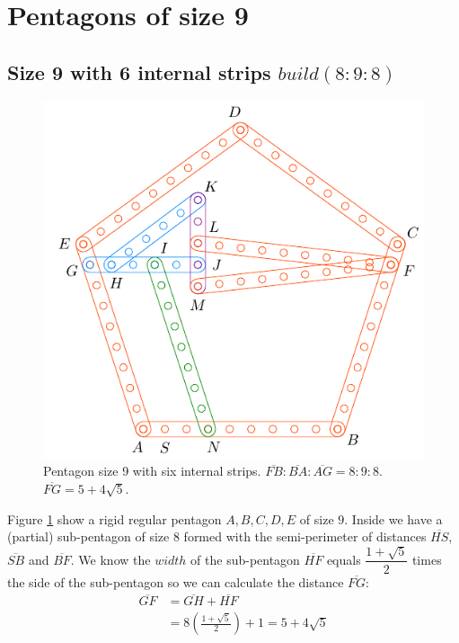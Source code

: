 \documentclass[11pt]{article}
\begin{document}

\section{Pentagons of size 9}

\subsection{Size 9 with 6 internal strips $build(8:9:8)$}

\begin{figure}[h]
 \centering
 \includegraphics[scale=0.95]{9/penta9a}
 \caption{Pentagon size 9 with six internal strips. $\overline{FB}:\overline{BA}:\overline{AG} = 8:9:8$. $\overline{FG}=5+4\sqrt5$. }
 \label{fig:penta9a}
\end{figure}

Figure \ref{fig:penta9a} show a rigid regular pentagon $A,B,C,D,E$ of size $9$. Inside we have a (partial) sub-pentagon of size $8$ formed with the semi-perimeter of distances $\overline{HS}$, $\overline{SB}$ and $\overline{BF}$. We know the $width$ of the sub-pentagon $\overline{HF}$ equals $\dfrac{1+\sqrt5}2$ times the side of the sub-pentagon so we can calculate the distance $\overline{FG}$:
\begin{align}
\overline{GF} &= \overline{GH} + \overline{HF} \nonumber\\
 &= 8\left(\frac{1+\sqrt5}2\right) + 1 = 5 + 4\sqrt5
\end{align}
\end{document}
